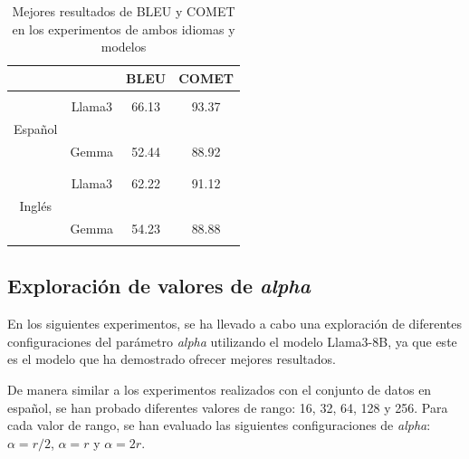 \documentclass[11pt,spanish,listoffigures,listoftables]{tfgetsinf}
\begin{document}
\begin{table}[h]
\centering
\begin{tabular}{c  c | c c}

             &  & BLEU & COMET \\ 
\hline
\hline
& & & \\
 & Llama3 &   66.13   &   93.37    \\
Español &  &      &       \\
 & Gemma  &   52.44   &    88.92   \\
& & & \\
\hline
& & &  \\
 & Llama3 & 62.22    &   91.12    \\
Inglés &  &      &       \\
 & Gemma  &  54.23    &    88.88   \\
& & &  \\
\end{tabular}
\caption{Mejores resultados de BLEU y COMET en los experimentos de ambos idiomas y modelos}
\label{tab:comparacionIdiomas}
\end{table}

\subsection{Exploración de valores de \textit{alpha}}

En los siguientes experimentos, se ha llevado a cabo una exploración de diferentes configuraciones del parámetro \textit{alpha} utilizando el modelo Llama3-8B, ya que este es el modelo que ha demostrado ofrecer mejores resultados.

De manera similar a los experimentos realizados con el conjunto de datos en español, se han probado diferentes valores de rango: 16, 32, 64, 128 y 256. Para cada valor de rango, se han evaluado las siguientes configuraciones de \textit{alpha}: $\alpha = r/2$, $\alpha = r$ y $\alpha = 2r$.
\end{document}
